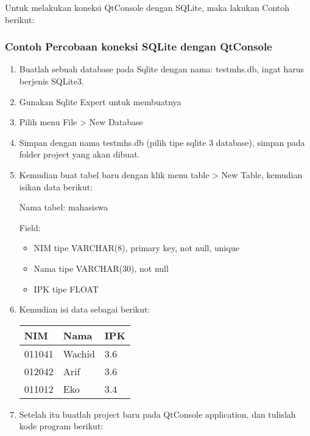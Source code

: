 Untuk melakukan koneksi QtConsole dengan SQLite, maka lakukan Contoh
berikut:

\subsubsection*{Contoh Percobaan koneksi SQLite dengan QtConsole}

\begin{enumerate}


\item
Buatlah sebuah database pada Sqlite dengan nama: testmhs.db, ingat
harus berjenis SQLite3.



\item
Gunakan Sqlite Expert untuk membuatnya
\item
Pilih menu File \textgreater{} New Database


\item
Simpan dengan nama testmhs.db (pilih tipe sqlite 3 database), simpan
pada folder project yang akan dibuat.
\item
Kemudian buat tabel baru dengan klik menu table \textgreater{} New Table,
kemudian isikan data berikut:

Nama tabel: mahasiswa

Field:

\begin{itemize}

\item
NIM tipe VARCHAR(8), primary key, not null, unique
\item
Nama tipe VARCHAR(30), not null
\item
IPK tipe FLOAT
\end{itemize}


\item
Kemudian isi data sebagai berikut:


\begin{longtable}[]{@{}lll@{}}
\toprule
NIM & Nama & IPK\tabularnewline
\midrule
\endhead
011041 & Wachid & 3.6\tabularnewline
012042 & Arif & 3.6\tabularnewline
011012 & Eko & 3.4\tabularnewline
\bottomrule
\end{longtable}


\item
Setelah itu buatlah project baru pada QtConsole application, dan
tulislah kode program berikut:




\end{enumerate}
